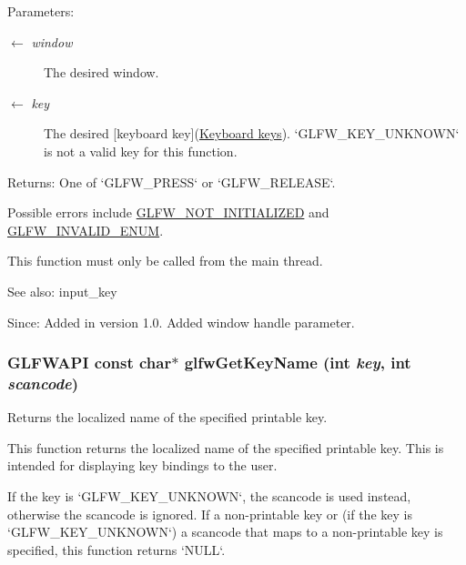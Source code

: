\begin{Desc}
\item[Parameters:]
\begin{description}
\item[\mbox{$\leftarrow$} {\em window}]The desired window. \item[\mbox{$\leftarrow$} {\em key}]The desired \mbox{[}keyboard key\mbox{]}(\hyperlink{group__keys}{Keyboard keys}). `GLFW\_\-KEY\_\-UNKNOWN` is not a valid key for this function. \end{description}
\end{Desc}
\begin{Desc}
\item[Returns:]One of `GLFW\_\-PRESS` or `GLFW\_\-RELEASE`.\end{Desc}
Possible errors include \hyperlink{group__errors_g2374ee02c177f12e1fa76ff3ed15e14a}{GLFW\_\-NOT\_\-INITIALIZED} and \hyperlink{group__errors_g76f6bb9c4eea73db675f096b404593ce}{GLFW\_\-INVALID\_\-ENUM}.

This function must only be called from the main thread.

\begin{Desc}
\item[See also:]input\_\-key\end{Desc}
\begin{Desc}
\item[Since:]Added in version 1.0.  Added window handle parameter. \end{Desc}
\hypertarget{group__input_g9323a397832dd03faa2a88534847c984}{
\subsubsection[glfwGetKeyName]{\setlength{\rightskip}{0pt plus 5cm}GLFWAPI const char$\ast$ glfwGetKeyName (int {\em key}, \/  int {\em scancode})}}
\label{group__input_g9323a397832dd03faa2a88534847c984}


Returns the localized name of the specified printable key. 

This function returns the localized name of the specified printable key. This is intended for displaying key bindings to the user.

If the key is `GLFW\_\-KEY\_\-UNKNOWN`, the scancode is used instead, otherwise the scancode is ignored. If a non-printable key or (if the key is `GLFW\_\-KEY\_\-UNKNOWN`) a scancode that maps to a non-printable key is specified, this function returns `NULL`.

